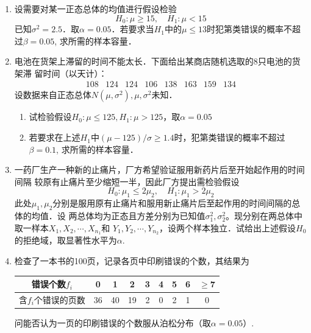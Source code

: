 \begin{enumerate}
    \item 设需要对某一正态总体的均值进行假设检验
    $$H_0:\mu \geq 15,\quad H_1:\mu <15$$
    已知$\sigma^2=2.5$．取$\alpha=0.05$．若要求当$H_1$中的$\mu\leq 13$时犯第\uppercase\expandafter{}类错误的概率不超过$\beta=0.05$,
    求所需的样本容量．




    \item 电池在货架上滞留的时间不能太长．下面给出某商店随机选取的8只电池的货架滞
    留时间（以天计）：
    $$\begin{array}{cccccccc}
        108 & 124 & 124 & 106 & 138 & 163 & 159 & 134
    \end{array}$$
    设数据来自正态总体$N(\mu,\sigma^2),\mu,\sigma^2$未知．
    \begin{enumerate}
        \item 试检验假设$H_0:\mu \leq 125,H_1:\mu >125$，取$\alpha=0.05$
        \item 若要求在上述$H_1$中$(\mu-125)/\sigma\geq 1.4$时，犯第\uppercase\expandafter{}类错误的概率不超过$\beta=0.1$,
        求所需的样本容量．
    \end{enumerate}




    \item 一药厂生产一种新的止痛片，厂方希望验证服用新药片后至开始起作用的时间间隔
    较原有止痛片至少缩短一半，因此厂方提出需检验假设
    $$H_0:\mu_1\leq 2\mu_2,\quad H_1:\mu_1>2\mu_2$$
    此处$\mu_1,\mu_2$分别是服用原有止痛片和服用新止痛片后至起作用的时间间隔的总体的均值．设
    两总体均为正态且方差分别为已知值$\sigma_1^2,\sigma_2^2$。现分别在两总体中取一样本$X_1,X_2,\cdots,X_{n_1}$和
    $Y_1,Y_2,\cdots,Y_{n_2}$，设两个样本独立．试给出上述假设$H_0$的拒绝域，取显著性水平为$\alpha$.




    \item 检查了一本书的100页，记录各页中印刷错误的个数，其结果为
    \renewcommand{\arraystretch}{1.3} 
    \begin{table}[H]\centering
        \begin{tabular}{c|cccccccc}
        错误个数$f_i$    & 0  & 1  & 2  & 3 & 4 & 5 & 6 & $\geq$7 \\ \hline
        含$f_i$个错误的页数 & 36 & 40 & 19 & 2 & 0 & 2 & 1 & 0      
        \end{tabular}
    \end{table}
    \renewcommand{\arraystretch}{1.0} 
    问能否认为一页的印刷错误的个数服从泊松分布（取$\alpha=0.05$）.






\end{enumerate}
